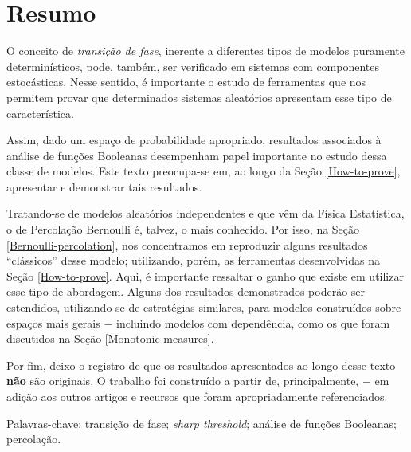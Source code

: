 \newpage

\section*{\Large \hspace*{\fill} \textbf{Resumo} \hspace*{\fill}}

O conceito de \textit{transição de fase}, inerente a diferentes tipos de modelos puramente determinísticos, pode, também, ser verificado em sistemas com componentes estocásticas. Nesse sentido, é importante o estudo de ferramentas que nos permitem provar que determinados sistemas aleatórios apresentam esse tipo de característica. 

Assim, dado um espaço de probabilidade apropriado, resultados associados à análise de funções Booleanas desempenham papel importante no estudo dessa classe de modelos. Este texto preocupa-se em, ao longo da Seção \ref{How-to-prove}, apresentar e demonstrar tais resultados.

Tratando-se de modelos aleatórios independentes e que vêm da Física Estatística, o de Percolação Bernoulli é, talvez, o mais conhecido. Por isso, na Seção \ref{Bernoulli-percolation}, nos concentramos em reproduzir alguns resultados ``clássicos'' desse modelo; utilizando, porém, as ferramentas desenvolvidas na Seção \ref{How-to-prove}. Aqui, é importante ressaltar o ganho que existe em utilizar esse tipo de abordagem. Alguns dos resultados demonstrados poderão ser estendidos, utilizando-se de estratégias similares, para modelos construídos sobre espaços mais gerais $-$ incluindo modelos com dependência, como os que foram discutidos na Seção \ref{Monotonic-measures}.

Por fim, deixo o registro de que os resultados apresentados ao longo desse texto \textbf{não} são originais. O trabalho foi construído a partir de, principalmente, \cite{duminil2019sharp} $-$ em adição aos outros artigos e recursos que foram apropriadamente referenciados.

\vspace{12pt}

\par Palavras-chave: transição de fase; \textit{sharp threshold}; análise de funções Booleanas; percolação.
